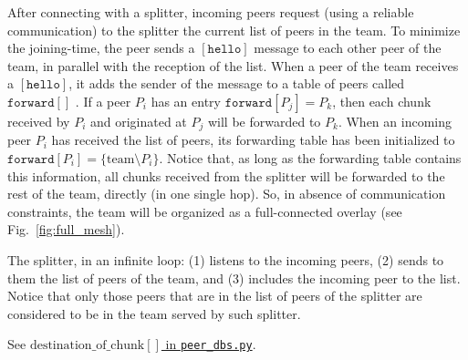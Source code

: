 

\label{sec:joining}

After connecting with a splitter, incoming peers request (using a
reliable communication) to the splitter the current list of peers in
the team. To minimize the \gls{joining-time}, the peer sends a
$[\mathtt{hello}]$ message to each other peer of the team, in parallel
with the reception of the list. When a peer of the team receives a
$[\mathtt{hello}]$, it adds the sender of the message to a table of
peers called $\mathtt{forward}[]$ . If a peer $P_i$ has an entry
$\mathtt{forward}[P_j]=P_k$, then each chunk received by $P_i$ and
originated at $P_j$ will be forwarded to $P_k$. When an incoming peer
$P_i$ has received the list of peers, its forwarding table has been
initialized to $\mathtt{forward}[P_i]=\{\text{team}\setminus
P_i\}$. Notice that, as long as the forwarding table contains this
information, all chunks received from the splitter will be forwarded
to the rest of the team, directly (in one single hop). So, in absence
of communication constraints, the team will be organized as a
full-connected overlay (see Fig.~\ref{fig:full_mesh}).


The splitter, in an infinite loop: (1) listens to the incoming peers,
(2) sends to them the list of peers of the team, and (3) includes the
incoming peer to the list. Notice that only those peers that are in
the list of peers of the splitter are considered to be in the team
served by such splitter.

\begin{comment}
\begin{figure*}
  \fig{1000}{10cm}{joining} \caption{Code related to team
    joining.\label{fig:joining}}
\end{figure*}

The new pseudo-code related to joining a team is describen in the
Fig.~\ref{fig:joining}.
\end{comment}

\begin{notex}
  See \href{https://github.com/P2PSP/simulator/blob/f0c73be1817e7d3b816cc61cd2c8e59b17f9a0e6/src/core/splitter_dbs.py#L296}{$\text{destination\_of\_chunk}[]$ in \texttt{peer\_dbs.py}}.
\end{notex}
